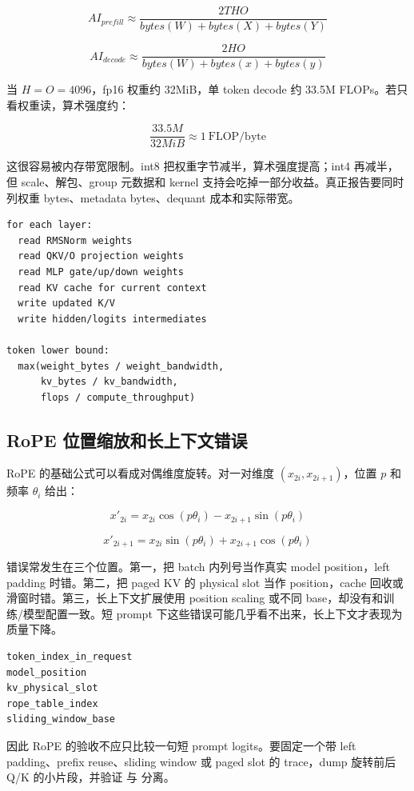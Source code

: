 \[
AI_{prefill} \approx \frac{2T H O}{bytes(W) + bytes(X) + bytes(Y)}
\]

\[
AI_{decode} \approx \frac{2H O}{bytes(W) + bytes(x) + bytes(y)}
\]

当 \(H=O=4096\)，fp16 权重约 32MiB，单 token decode 约 33.5M FLOPs。若只看权重读，算术强度约：

\[
\frac{33.5M}{32MiB} \approx 1\ \mathrm{FLOP/byte}
\]

这很容易被内存带宽限制。int8 把权重字节减半，算术强度提高；int4 再减半，但 scale、解包、group 元数据和 kernel 支持会吃掉一部分收益。真正报告要同时列权重 bytes、metadata bytes、dequant 成本和实际带宽。

\begin{lstlisting}[numbers=none,caption={decode token 的最小带宽账本}]
for each layer:
  read RMSNorm weights
  read QKV/O projection weights
  read MLP gate/up/down weights
  read KV cache for current context
  write updated K/V
  write hidden/logits intermediates

token lower bound:
  max(weight_bytes / weight_bandwidth,
      kv_bytes / kv_bandwidth,
      flops / compute_throughput)
\end{lstlisting}

\subsection{RoPE 位置缩放和长上下文错误}

RoPE 的基础公式可以看成对偶维度旋转。对一对维度 \((x_{2i}, x_{2i+1})\)，位置 \(p\) 和频率 \(\theta_i\) 给出：

\[
x'_{2i}=x_{2i}\cos(p\theta_i)-x_{2i+1}\sin(p\theta_i)
\]

\[
x'_{2i+1}=x_{2i}\sin(p\theta_i)+x_{2i+1}\cos(p\theta_i)
\]

错误常发生在三个位置。第一，把 batch 内列号当作真实 model position，left padding 时错。第二，把 paged KV 的 physical slot 当作 position，cache 回收或滑窗时错。第三，长上下文扩展使用 position scaling 或不同 base，却没有和训练/模型配置一致。短 prompt 下这些错误可能几乎看不出来，长上下文才表现为质量下降。

\begin{lstlisting}[numbers=none,caption={RoPE trace 必须拆开的三个位置}]
token_index_in_request
model_position
kv_physical_slot
rope_table_index
sliding_window_base
\end{lstlisting}

因此 RoPE 的验收不应只比较一句短 prompt logits。要固定一个带 left padding、prefix reuse、sliding window 或 paged slot 的 trace，dump 旋转前后 Q/K 的小片段，并验证  与  分离。


